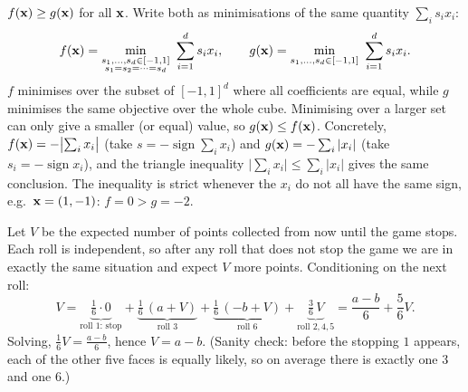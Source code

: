 \begin{solution}
$f(\mathbf{x})\ge g(\mathbf{x})$ for all $\mathbf{x}$.
Write both as minimisations of the same quantity $\sum_i s_i x_i$:
\[
f(\bvec x)=\min_{\substack{s_1,\dots,s_d\in[-1,1]\\ s_1=s_2=\dots=s_d}}\ \sum_{i=1}^d s_i x_i,
\qquad
g(\bvec x)=\min_{s_1,\dots,s_d\in[-1,1]}\ \sum_{i=1}^d s_i x_i .
\]
$f$ minimises over the subset of $[-1,1]^d$ where all coefficients are equal, while $g$ minimises the same
objective over the whole cube. Minimising over a larger set can only give a smaller (or equal) value, so
$g(\mathbf{x})\le f(\mathbf{x})$.
Concretely, $f(\mathbf{x})=-\bigl|\sum_i x_i\bigr|$ (take $s=-\operatorname{sign}\sum_i x_i$) and
$g(\mathbf{x})=-\sum_i|x_i|$ (take $s_i=-\operatorname{sign}x_i$), and the triangle inequality
$\bigl|\sum_i x_i\bigr|\le\sum_i|x_i|$ gives the same conclusion. The inequality is strict whenever the $x_i$ do
not all have the same sign, e.g.\ $\mathbf{x}=(1,-1)$: $f=0>g=-2$.
\end{solution}

\begin{solution}
Let $V$ be the expected number of points collected from now until the game stops. Each roll is independent,
so after any roll that does not stop the game we are in exactly the same situation and expect $V$ more points.
Conditioning on the next roll:
\[
V=\underbrace{\tfrac16\cdot 0}_{\text{roll }1\text{: stop}}
 +\underbrace{\tfrac16\,(a+V)}_{\text{roll }3}
 +\underbrace{\tfrac16\,(-b+V)}_{\text{roll }6}
 +\underbrace{\tfrac36\,V}_{\text{roll }2,4,5}
 =\frac{a-b}{6}+\frac56 V .
\]
Solving, $\tfrac16 V=\tfrac{a-b}{6}$, hence $\boxed{V=a-b}$.
(Sanity check: before the stopping $1$ appears, each of the other five faces is equally likely, so on
average there is exactly one $3$ and one $6$.)
\end{solution}

